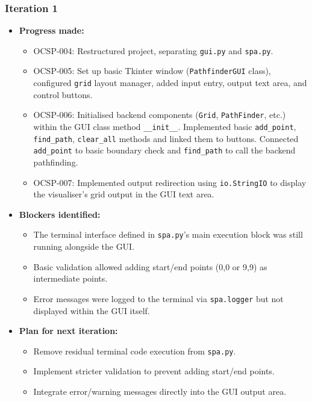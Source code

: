 \subsubsection{Iteration 1}
\begin{itemize}
	\item \textbf{Progress made:}
	\begin{itemize}
		\item OCSP-004: Restructured project, separating \verb|gui.py| and \verb|spa.py|.
		\item OCSP-005: Set up basic Tkinter window (\verb|PathfinderGUI| class), configured \verb|grid| layout manager, added input entry, output text area, and control buttons.
		\item OCSP-006: Initialised backend components (\verb|Grid|, \verb|PathFinder|, etc.) within the GUI class method \verb|__init__|. Implemented basic \verb|add_point|, \verb|find_path|, \verb|clear_all| methods and linked them to buttons. Connected \verb|add_point| to basic boundary check and \verb|find_path| to call the backend pathfinding.
		\item OCSP-007: Implemented output redirection using \verb|io.StringIO| to display the visualiser's grid output in the GUI text area.
	\end{itemize}
	\item \textbf{Blockers identified:}
	\begin{itemize}
		\item The terminal interface defined in \verb|spa.py|'s main execution block was still running alongside the GUI.
		\item Basic validation allowed adding start/end points (0,0 or 9,9) as intermediate points.
		\item Error messages were logged to the terminal via \verb|spa.logger| but not displayed within the GUI itself.
	\end{itemize}
	\item \textbf{Plan for next iteration:}
	\begin{itemize}
		\item Remove residual terminal code execution from \verb|spa.py|.
		\item Implement stricter validation to prevent adding start/end points.
		\item Integrate error/warning messages directly into the GUI output area.
	\end{itemize}
\end{itemize}


